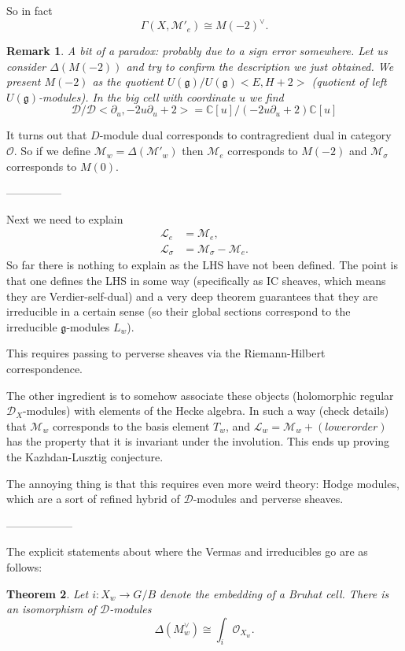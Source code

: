 \documentclass[12pt]{article}
\theoremstyle{plain}
\newtheorem{thm}{Theorem}[section]
\newtheorem{rem}[thm]{Remark}
\theoremstyle{definition}
\numberwithin{equation}{section}
\newcommand{\M}{\mathcal{M}}
\newcommand{\D}{\Delta}
\newcommand{\C}{\mathbb{C}}
\newcommand{\g}{\mathfrak{g}}
\newcommand{\CD}{\mathcal{D}}
\newcommand{\CL}{\mathcal{L}}
\newcommand{\OO}{\mathcal{O}}
\begin{document}
So in fact
\[
\Gamma(X, \M'_e) \cong M(-2)^\vee.
\]

{\color{blue}
\begin{rem}
A bit of a paradox: probably due to a sign error somewhere. Let us consider $\Delta(M(-2))$ and try to confirm the description we just obtained. We present $M(-2)$ as the quotient $U(\g) / U(\g) <E, H+2>$ (quotient of left $U(\g)$-modules). In the big cell with coordinate $u$ we find
\[
\CD / \CD <\partial_u, -2u \partial_u + 2> = \C[u] / (-2u \partial_u + 2)\C[u]
\]

\end{rem}
}


It turns out that $D$-module dual corresponds to contragredient dual in category $\OO$. So if we define $\M_w = \D(\M'_w)$ then $\M_e$ corresponds to $M(-2)$ and $\M_\sigma$ corresponds to $M(0)$.

---------------

Next we need to explain
\begin{align*}
\CL_e &= \M_e, \\
%
\CL_\sigma &= \M_\sigma - \M_e.
\end{align*}
So far there is nothing to explain as the LHS have not been defined. The point is that one defines the LHS in some way (specifically as IC sheaves, which means they are Verdier-self-dual) and a very deep theorem guarantees that they are irreducible in a certain sense (so their global sections correspond to the irreducible $\g$-modules $L_w$).

This requires passing to perverse sheaves via the Riemann-Hilbert correspondence.

The other ingredient is to somehow associate these objects (holomorphic regular $\CD_X$-modules) with elements of the Hecke algebra. In such a way (check details) that $\M_w$ corresponds to the basis element $T_w$, and $\CL_w = \M_w + (lower order)$ has the property that it is invariant under the involution. This ends up proving the Kazhdan-Lusztig conjecture.

The annoying thing is that this requires even more weird theory: Hodge modules, which are a sort of refined hybrid of $\CD$-modules and perverse sheaves.


------------------

The explicit statements about where the Vermas and irreducibles go are as follows:
\begin{thm}
Let $i : X_w \rightarrow G/B$ denote the embedding of a Bruhat cell. There is an isomorphism of $\CD$-modules
\[
\D(M_w^\vee) \cong \int_i \OO_{X_w}.
\]
\end{thm}
\end{document}
